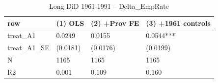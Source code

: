 \begin{table}

\caption{Long DiD 1961-1991 -- Delta_EmpRate}
\centering
\begin{tabular}[t]{llll}
\toprule
row & (1) OLS & (2) +Prov FE & (3) +1961 controls\\
\midrule
treat\_A1 & 0.0249 & 0.0155 & 0.0544***\\
treat\_A1\_SE & (0.0181) & (0.0176) & (0.0199)\\
N & 1165 & 1165 & 1165\\
R2 & 0.001 & 0.109 & 0.160\\
\bottomrule
\end{tabular}
\end{table}
